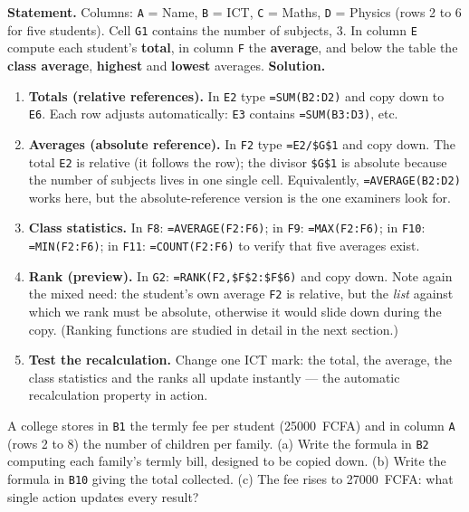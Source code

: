 \documentclass[11pt]{article}
\begin{document}
\begin{exoresolu}
\textbf{Statement.} Columns: \texttt{A} = Name, \texttt{B} = ICT, \texttt{C} = Maths, \texttt{D} = Physics (rows 2 to 6 for five students). Cell \texttt{G1} contains the number of subjects, $3$. In column \texttt{E} compute each student's \textbf{total}, in column \texttt{F} the \textbf{average}, and below the table the \textbf{class average}, \textbf{highest} and \textbf{lowest} averages.
\tcblower
\textbf{Solution.}
\begin{enumerate}
\item \textbf{Totals (relative references).} In \texttt{E2} type \texttt{=SUM(B2:D2)} and copy down to \texttt{E6}. Each row adjusts automatically: \texttt{E3} contains \texttt{=SUM(B3:D3)}, etc.
\item \textbf{Averages (absolute reference).} In \texttt{F2} type \texttt{=E2/\$G\$1} and copy down. The total \texttt{E2} is relative (it follows the row); the divisor \texttt{\$G\$1} is absolute because the number of subjects lives in one single cell. Equivalently, \texttt{=AVERAGE(B2:D2)} works here, but the absolute-reference version is the one examiners look for.
\item \textbf{Class statistics.} In \texttt{F8}: \texttt{=AVERAGE(F2:F6)}; in \texttt{F9}: \texttt{=MAX(F2:F6)}; in \texttt{F10}: \texttt{=MIN(F2:F6)}; in \texttt{F11}: \texttt{=COUNT(F2:F6)} to verify that five averages exist.
\item \textbf{Rank (preview).} In \texttt{G2}: \texttt{=RANK(F2,\$F\$2:\$F\$6)} and copy down. Note again the mixed need: the student's own average \texttt{F2} is relative, but the \emph{list} against which we rank must be absolute, otherwise it would slide down during the copy. (Ranking functions are studied in detail in the next section.)
\item \textbf{Test the recalculation.} Change one ICT mark: the total, the average, the class statistics and the ranks all update instantly --- the automatic recalculation property in action.
\end{enumerate}
\end{exoresolu}

\begin{exercice}
A college stores in \texttt{B1} the termly fee per student (\SI{25000}{FCFA}) and in column \texttt{A} (rows 2 to 8) the number of children per family. (a) Write the formula in \texttt{B2} computing each family's termly bill, designed to be copied down. (b) Write the formula in \texttt{B10} giving the total collected. (c) The fee rises to \SI{27000}{FCFA}: what single action updates every result?
\end{exercice}
\end{document}
